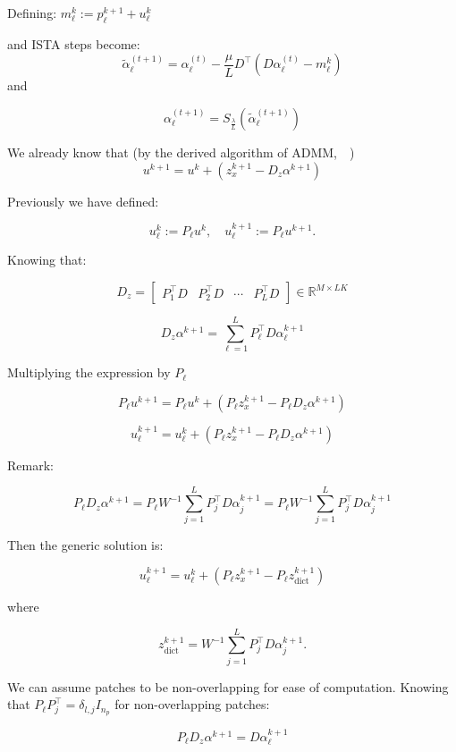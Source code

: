 \documentclass{article}
\newcounter{subsubsubsection}[subsubsection]
\theoremstyle{definition}
\begin{document}
Defining: $m_{\ell}^k:=p_{\ell}^{k+1}+u_{\ell}^k$

and ISTA steps become:
$$
\tilde{\alpha}_{\ell}^{(t+1)}=\alpha_{\ell}^{(t)}-\frac{\mu}{L} D^{\top}\left(D \alpha_{\ell}^{(t)}-m_{\ell}^k\right)
$$
and 

$$
\alpha_{\ell}^{(t+1)}=S_{\frac{\lambda}{L}}\left(\tilde{\alpha}_{\ell}^{(t+1)}\right)
$$







We already know that (by the derived algorithm of ADMM,~\cite{ADMM}~\cite{ScaledADMM}) 
$$
u^{k+1}=u^k+\left(z_x^{k+1}-D_{z} \alpha^{k+1}\right)
$$


Previously we have defined:

$$
u_{\ell}^k:=P_{\ell} u^k, \quad u_{\ell}^{k+1}:=P_{\ell} u^{k+1} .
$$

Knowing that:

$$
D_{z}=\left[\begin{array}{llll}
P_1^{\top} D & P_2^{\top} D & \cdots & P_L^{\top} D
\end{array}\right] \in \mathbb{R}^{M \times L K}
$$

$$
D_{z}
\alpha^{k+1}=\sum_{\ell=1}^L P_{\ell}^{\top} D \alpha_{\ell}^{k+1}
$$


Multiplying the expression by $P_\ell$

$$
P_{\ell} u^{k+1}=P_{\ell} u^k+\left(P_{\ell} z_x^{k+1}-P_{\ell} D_{z}\alpha^{k+1}\right)
$$


$$
u_{\ell}^{k+1}=u_{\ell}^k+\left(P_{\ell} z_x^{k+1}-P_{\ell} D_{z} \alpha^{k+1}\right)
$$


Remark:


$$
P_{\ell} D_{z}\alpha^{k+1}=P_{\ell} W^{-1}\sum_{j=1}^L P_j^{\top} D \alpha_j^{k+1}=P_{\ell} W^{-1}\sum_{j=1}^L P_j^{\top} D \alpha_j^{k+1}
$$

Then the generic solution is:

$$
u_{\ell}^{k+1}=u_{\ell}^k+\left(P_{\ell} z_x^{k+1}-P_{\ell} z_{\mathrm{dict}}^{k+1}\right)
$$

where

$$
z_{\text {dict }}^{k+1}=W^{-1} \sum_{j=1}^L P_j^{\top} D \alpha_j^{k+1} .
$$

We can assume patches to be non-overlapping for ease of computation. Knowing that $P_{\ell} P_j^{\top}=\delta_{l,j}I_{n_p}$ for non-overlapping patches:

$$
P_{\ell} D_{z}\alpha^{k+1}=D \alpha_{\ell}^{k+1}
$$
\end{document}
